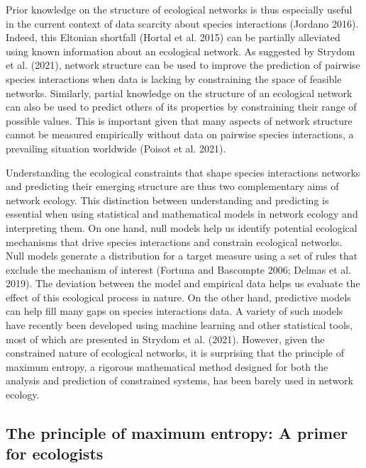 \documentclass[10pt,oneside]{article}
\begin{document}
Prior knowledge on the structure of ecological networks is thus
especially useful in the current context of data scarcity about species
interactions (Jordano 2016). Indeed, this Eltonian shortfall (Hortal et
al. 2015) can be partially alleviated using known information about an
ecological network. As suggested by Strydom et al. (2021), network
structure can be used to improve the prediction of pairwise species
interactions when data is lacking by constraining the space of feasible
networks. Similarly, partial knowledge on the structure of an ecological
network can also be used to predict others of its properties by
constraining their range of possible values. This is important given
that many aspects of network structure cannot be measured empirically
without data on pairwise species interactions, a prevailing situation
worldwide (Poisot et al. 2021).

Understanding the ecological constraints that shape species interactions
networks and predicting their emerging structure are thus two
complementary aims of network ecology. This distinction between
understanding and predicting is essential when using statistical and
mathematical models in network ecology and interpreting them. On one
hand, null models help us identify potential ecological mechanisms that
drive species interactions and constrain ecological networks. Null
models generate a distribution for a target measure using a set of rules
that exclude the mechanism of interest (Fortuna and Bascompte 2006;
Delmas et al. 2019). The deviation between the model and empirical data
helps us evaluate the effect of this ecological process in nature. On
the other hand, predictive models can help fill many gaps on species
interactions data. A variety of such models have recently been developed
using machine learning and other statistical tools, most of which are
presented in Strydom et al. (2021). However, given the constrained
nature of ecological networks, it is surprising that the principle of
maximum entropy, a rigorous mathematical method designed for both the
analysis and prediction of constrained systems, has been barely used in
network ecology.

\hypertarget{the-principle-of-maximum-entropy-a-primer-for-ecologists}{%
\subsection{The principle of maximum entropy: A primer for
ecologists}\label{the-principle-of-maximum-entropy-a-primer-for-ecologists}}
\end{document}
